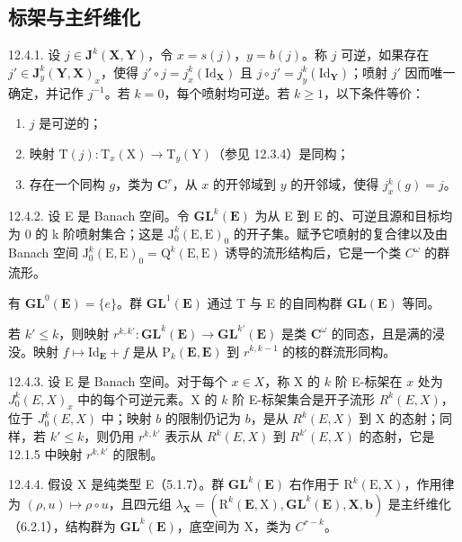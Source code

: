 \subsection{标架与主纤维化}

12.4.1. 设 \(j \in \mathbf{J}^k(\mathbf{X}, \mathbf{Y})\)，令 \(x = s(j)\)，\(y = b(j)\)。称 \(j\) 可逆，如果存在 \(j' \in \mathbf{J}_y^k(\mathbf{Y}, \mathbf{X})_x\)，使得 \(j' \circ j = j_x^k(\mathrm{Id}_{\mathbf{X}})\) 且 \(j \circ j' = j_y^k(\mathrm{Id}_{\mathbf{Y}})\)；喷射 \(j'\) 因而唯一确定，并记作 \(j^{-1}\)。若 \(k = 0\)，每个喷射均可逆。若 \(k \geqslant 1\)，以下条件等价：

\begin{enumerate}
\def\labelenumi{\alph{enumi})}
\item
  \(j\) 是可逆的；
\item
  映射 \(\mathrm{T}(j)\colon\mathrm{T}_{x}(\mathrm{X})\rightarrow\mathrm{T}_{y}(\mathrm{Y})\)（参见 12.3.4）是同构；
\item
  存在一个同构 \(g\)，类为 \(\mathbf{C}^r\)，从 \(x\) 的开邻域到 \(y\) 的开邻域，使得 \(j_x^k(g) = j\)。
\end{enumerate}

12.4.2. 设 E 是 Banach 空间。令 \(\mathbf{GL}^{k}(\mathbf{E})\) 为从 E 到 E 的、可逆且源和目标均为 0 的 k 阶喷射集合；这是 \(\mathrm{J}_{0}^{k}(\mathrm{E},\mathrm{E})_{0}\) 的开子集。赋予它喷射的复合律以及由 Banach 空间 \(\mathrm{J}_{0}^{k}(\mathrm{E},\mathrm{E})_{0}=\mathrm{Q}^{k}(\mathrm{E},\mathrm{E})\) 诱导的流形结构后，它是一个类 \(C^{\omega}\) 的群流形。

有 \(\mathbf{GL}^0 (\mathbf{E}) = \{e\}\)。群 \(\mathbf{GL}^1 (\mathbf{E})\) 通过 T 与 E 的自同构群 \(\mathbf{GL}(\mathbf{E})\) 等同。

若 \(k' \leqslant k\)，则映射 \(r^{k, k'}: \mathbf{GL}^k(\mathbf{E}) \to \mathbf{GL}^{k'}(\mathbf{E})\) 是类 \(\mathbf{C}^\omega\) 的同态，且是满的浸没。映射 \(f \mapsto \mathrm{Id}_{\mathbf{E}} + f\) 是从 \(\mathrm{P}_k(\mathbf{E}, \mathbf{E})\) 到 \(r^{k, k-1}\) 的核的群流形同构。

12.4.3. 设 E 是 Banach 空间。对于每个 \(x \in X\)，称 X 的 \(k\) 阶 E-标架在 \(x\) 处为 \(J_0^k(E, X)_x\) 中的每个可逆元素。X 的 \(k\) 阶 E-标架集合是开子流形 \(R^k(E, X)\)，位于 \(J_0^k(E, X)\) 中；映射 \(b\) 的限制仍记为 \(b\)，是从 \(R^k(E, X)\) 到 X 的态射；同样，若 \(k' \leqslant k\)，则仍用 \(r^{k, k'}\) 表示从 \(R^k(E, X)\) 到 \(R^{k'}(E, X)\) 的态射，它是 12.1.5 中映射 \(r^{k, k'}\) 的限制。

12.4.4. 假设 X 是纯类型 E（5.1.7）。群 \(\mathbf{GL}^{k}(\mathbf{E})\) 右作用于 \(\mathrm{R}^{k}(\mathrm{E},\mathrm{X})\)，作用律为 \((\rho,u)\mapsto\rho\circ u\)，且四元组 \(\lambda_{\mathbf{X}}=(\mathrm{R}^{k}(\mathbf{E},\mathrm{X}),\mathbf{GL}^{k}(\mathbf{E}),\mathbf{X},\mathbf{b})\) 是主纤维化（6.2.1），结构群为 \(\mathbf{GL}^{k}(\mathbf{E})\)，底空间为 X，类为 \(C^{r-k}\)。

